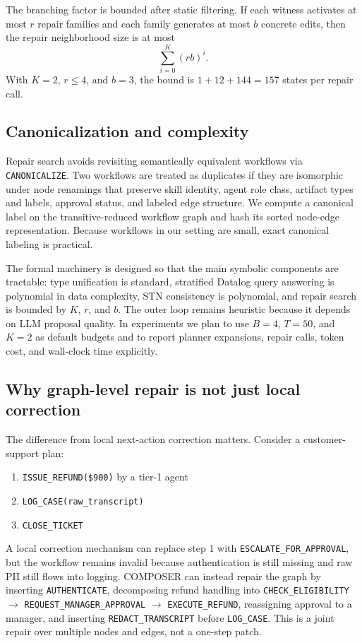 \documentclass[11pt]{article}
\begin{document}
The branching factor is bounded after static filtering. If each witness activates at most $r$ repair families and each family generates at most $b$ concrete edits, then the repair neighborhood size is at most
\[
\sum_{i=0}^{K}(rb)^i.
\]
With $K=2$, $r \leq 4$, and $b=3$, the bound is $1+12+144=157$ states per repair call.

\subsection{Canonicalization and complexity}
Repair search avoids revisiting semantically equivalent workflows via \texttt{CANONICALIZE}. Two workflows are treated as duplicates if they are isomorphic under node renamings that preserve skill identity, agent role class, artifact types and labels, approval status, and labeled edge structure. We compute a canonical label on the transitive-reduced workflow graph and hash its sorted node-edge representation. Because workflows in our setting are small, exact canonical labeling is practical.

The formal machinery is designed so that the main symbolic components are tractable: type unification is standard, stratified Datalog query answering is polynomial in data complexity, STN consistency is polynomial, and repair search is bounded by $K$, $r$, and $b$. The outer loop remains heuristic because it depends on LLM proposal quality. In experiments we plan to use $B=4$, $T=50$, and $K=2$ as default budgets and to report planner expansions, repair calls, token cost, and wall-clock time explicitly.

\subsection{Why graph-level repair is not just local correction}
The difference from local next-action correction matters. Consider a customer-support plan:
\begin{enumerate}
\item \texttt{ISSUE\_REFUND(\$900)} by a tier-1 agent
\item \texttt{LOG\_CASE(raw\_transcript)}
\item \texttt{CLOSE\_TICKET}
\end{enumerate}

A local correction mechanism can replace step 1 with \texttt{ESCALATE\_FOR\_APPROVAL}, but the workflow remains invalid because authentication is still missing and raw PII still flows into logging. COMPOSER can instead repair the graph by inserting \texttt{AUTHENTICATE}, decomposing refund handling into \texttt{CHECK\_ELIGIBILITY} $\rightarrow$ \texttt{REQUEST\_MANAGER\_APPROVAL} $\rightarrow$ \texttt{EXECUTE\_REFUND}, reassigning approval to a manager, and inserting \texttt{REDACT\_TRANSCRIPT} before \texttt{LOG\_CASE}. This is a joint repair over multiple nodes and edges, not a one-step patch.
\end{document}
